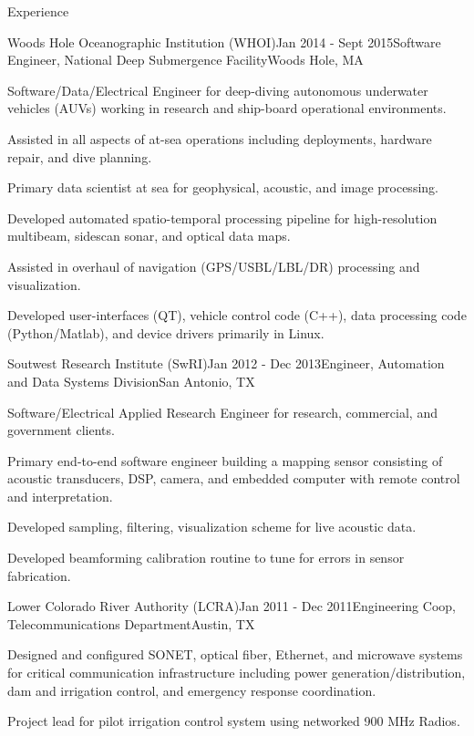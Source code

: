 \documentclass{resume} %
\begin{document}
\begin{rSection}{Experience}

\begin{rSubsection}{Woods Hole Oceanographic Institution (WHOI)}{Jan 2014 - Sept 2015}{Software Engineer, National Deep Submergence Facility}{Woods Hole, MA}
\item{Software/Data/Electrical Engineer for deep-diving autonomous underwater vehicles (AUVs) working in research and ship-board operational environments.}
\item{Assisted in all aspects of at-sea operations including deployments, hardware repair, and dive planning.}
\item{Primary data scientist at sea for geophysical, acoustic, and image processing.}
\item{Developed automated spatio-temporal processing pipeline for high-resolution multibeam, sidescan sonar, and optical data maps.}
\item{Assisted in overhaul of navigation (GPS/USBL/LBL/DR) processing and visualization.}
\item{Developed user-interfaces (QT), vehicle control code (C++), data processing code (Python/Matlab), and device drivers primarily in Linux.}
\end{rSubsection}
%
\begin{rSubsection}{Soutwest Research Institute (SwRI)}{Jan 2012 - Dec 2013}{Engineer, Automation and Data Systems Division}{San Antonio, TX}{}
\item{Software/Electrical Applied Research Engineer for research, commercial, and government clients.}
\item{Primary end-to-end software engineer building a mapping sensor consisting of acoustic transducers, DSP, camera, and embedded computer with remote control and interpretation.}
\item{Developed sampling, filtering, visualization scheme for live acoustic data.}
\item{Developed beamforming calibration routine to tune for errors in sensor fabrication.}
\end{rSubsection}

\hfill \break

\begin{rSubsection}{Lower Colorado River Authority (LCRA)}{Jan 2011 - Dec 2011}{Engineering Coop, Telecommunications Department}{Austin, TX}
\item{Designed and configured SONET, optical fiber, Ethernet, and microwave systems for critical communication infrastructure including power generation/distribution, dam and 
            irrigation control, and emergency response coordination. }
\item{Project lead for pilot irrigation control system using networked 900 MHz Radios.}
\end{rSubsection}


\end{rSection}
\end{document}
